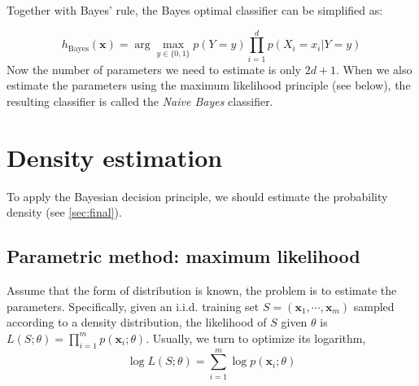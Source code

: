 \documentclass{article}
\begin{document}
	Together with Bayes' rule, the Bayes optimal classifier can be simplified as:
	
	\begin{equation}
	h_{\mathrm{Bayes}}(\bm{x}) = \arg\max\limits_{y\in\{0,1\}} p (Y=y) \prod_{i=1}^d p (X_i=x_i|Y=y)
	\end{equation}
Now the number of parameters we need to estimate is only $2d + 1$. When we also estimate the parameters using the maximum likelihood principle (see below), the resulting classifier is called the \textit{Naive Bayes} classifier.

\section{Density estimation}

	To apply the Bayesian decision principle, we should estimate the probability density (see \ref{sec:final}).
	
	\subsection{Parametric method: maximum likelihood}
	Assume that the form of distribution is known, the problem is to estimate the parameters. Specifically, given an i.i.d. training set $S = (\bm{x}_1,\cdots,\bm{x}_m)$ sampled according to a density distribution, the likelihood of $S$ given $\theta$ is $L(S;\theta) = \prod_{i=1}^m  p(\bm{x}_i;\theta)$.	Usually, we turn to optimize its logarithm,
	\begin{equation}
	\log L(S;\theta) = \sum_{i=1}^m \log p(\bm{x}_i;\theta)
	\end{equation}
		
\end{document}
